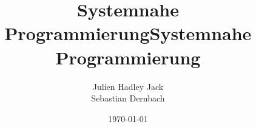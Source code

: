 \documentclass[
    pagesize=pdftex,    %
    twoside=false,      %
    fontsize=12pt,      %
    parskip=half,       %
    headsepline,        %
    footsepline,        %
    abstract=false,     %
    listof=totoc,       %
    toc=bibliography,   %
]{scrreprt}
\title{Systemnahe Programmierung}
\author{}
\date{\today}
\begin{document}



\title{Systemnahe Programmierung}



\author{
        Julien Hadley Jack \\
        Sebastian Dernbach \\
       }




\newpage



\pagestyle{plain}
\setcounter{tocdepth}{2}
\tableofcontents
\newpage












\clearpage
{}

\cleardoublepage
\listoffigures



\cleardoublepage
\printbibliography

\cleardoublepage


\printglossary[style=altlist,title=Glossar]
\end{document}
